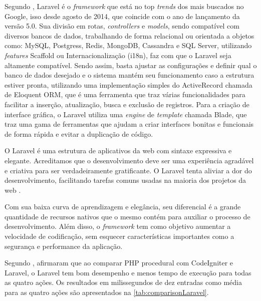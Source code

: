 Segundo , Laravel é o \textit{framework} que está no top \textit{trends} dos mais buscados no Google, isso desde agosto de 2014, que coincide com o ano de lançamento da versão 5.0. Sua divisão em rotas, \textit{controllers} e \textit{models}, sendo compatível com diversos bancos de dados, trabalhando de forma relacional ou orientada a objetos como: MySQL, Postgress, Redis, MongoDB, Cassandra e SQL Server, utilizando \textit{features} Scaffold ou Internacionalização (i18n), faz com que o Laravel seja altamente compatível. Sendo assim, basta ajustar as configurações e definir qual o banco de dados desejado e o sistema mantém seu funcionamento caso a estrutura estiver pronta, utilizando uma implementação simples do ActiveRecord chamada de Eloquent ORM, que é uma ferramenta que traz várias funcionalidades para facilitar a inserção, atualização, busca e exclusão de registros. Para a criação de interface gráfica, o Laravel utiliza uma \textit{engine} de \textit{template} chamada Blade, que traz uma gama de ferramentas que ajudam a criar interfaces bonitas e funcionais de forma rápida e evitar a duplicação de código.

\begin{citacao}
 O Laravel é uma estrutura de aplicativos da web com sintaxe expressiva e elegante. Acreditamos que o desenvolvimento deve ser uma experiência agradável e criativa para ser verdadeiramente gratificante. O Laravel tenta aliviar a dor do desenvolvimento, facilitando tarefas comuns usadas na maioria dos projetos da web \cite{laravel}.
\end{citacao}


Com sua baixa curva de aprendizagem e elegância, seu diferencial é a grande quantidade de recursos nativos que o mesmo contém para auxiliar o processo de desenvolvimento. Além disso, o \textit{framework} tem como objetivo aumentar a velocidade de codificação, sem esquecer características importantes como a segurança e performance da aplicação.

Segundo , afirmaram que ao comparar PHP procedural com CodeIgniter e Laravel, o Laravel tem bom desempenho e menos tempo de execução para todas as quatro ações. Os resultados em milissegundos de dez entradas como média para as quatro ações são apresentados na \autoref{tab:comparisonLaravel}.

